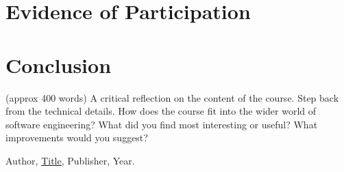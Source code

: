\documentclass{article}
\theoremstyle{theorem}
\theoremstyle{definition}
\theoremstyle{remark}
\begin{document}
\section{Evidence of Participation}
\section{Conclusion}\label{conclusion}

(approx 400 words) A critical reflection on the content of the course. Step back from the technical details. How does the course fit into the wider world of software engineering? What did you find most interesting or useful? What improvements would you suggest?

\begin{thebibliography}{99}
 Author, \href{https://en.wikipedia.org/wiki/LaTeX}{Title}, Publisher, Year.
\end{thebibliography}
\end{document}
